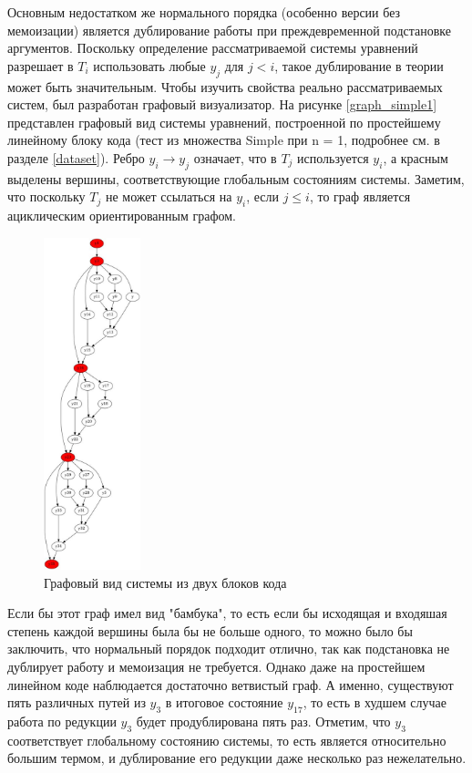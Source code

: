 \documentclass[../diploma.tex]{subfiles}
\begin{document}
Основным недостатком же нормального порядка (особенно версии без мемоизации) является дублирование работы при преждевременной подстановке аргументов. Поскольку определение рассматриваемой системы уравнений разрешает в $T_i$ использовать любые $y_j$ для $j < i$, такое дублирование в теории может быть значительным. Чтобы изучить свойства реально рассматриваемых систем, был разработан графовый визуализатор. На рисунке \ref{graph_simple1} представлен графовый вид системы уравнений, построенной по простейшему линейному блоку кода (тест из множества Simple при n = 1, подробнее см. в разделе \ref{dataset}). Ребро $y_i \rightarrow y_j$ означает, что в $T_j$ используется $y_i$, а красным выделены вершины, соответствующие глобальным состояниям системы. Заметим, что поскольку $T_j$ не может ссылаться на $y_i$, если $j \le i$, то граф является ациклическим ориентированным графом. 

\begin{figure}
    \centering
    \includegraphics[width=0.25\textwidth]{graph_simple2.jpeg}
    \caption{Графовый вид системы из двух блоков кода}\label{graph_simple2}
\end{figure}

Если бы этот граф имел вид "бамбука", то есть если бы исходящая и входяшая степень каждой вершины была бы не больше одного, то можно было бы заключить, что нормальный порядок подходит отлично, так как подстановка не дублирует работу и мемоизация не требуется. Однако даже на простейшем линейном коде наблюдается достаточно ветвистый граф. А именно, существуют пять различных путей из $y_3$ в итоговое состояние $y_{17}$, то есть в худшем случае работа по редукции $y_3$ будет продублирована пять раз. Отметим, что $y_3$ соответствует глобальному состоянию системы, то есть является относительно большим термом, и дублирование его редукции даже несколько раз нежелательно.
\end{document}
